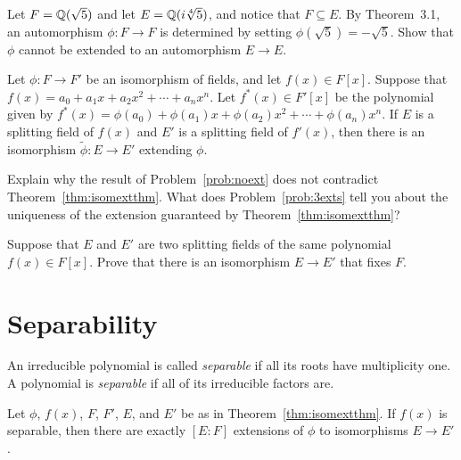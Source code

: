 \begin{problem}\label{prob:noext}
    Let $F = \mathbb{Q}(\sqrt{5})$ and let $E = \mathbb{Q}(i\sqrt[4]{5})$, and notice that $F\subseteq E$. By Theorem~3.1, an automorphism $\phi:F\longrightarrow F$ is determined by setting $\phi(\sqrt{5})=-\sqrt{5}$. Show that $\phi$ cannot be extended to an automorphism $E\longrightarrow E$.
\end{problem}



\begin{theorem}
    Let $\phi:F\longrightarrow F'$ be an isomorphism of fields, and let $f(x)\in F[x]$. Suppose that $f(x)=a_0 + a_1x + a_2x^2 + \cdots + a_nx^n$. Let $f^*(x)\in F'[x]$ be the polynomial given by $f^*(x)=\phi(a_0) + \phi(a_1)x + \phi(a_2)x^2 + \cdots + \phi(a_n)x^n$. If $E$ is a splitting field of $f(x)$ and $E'$ is a splitting field of $f'(x)$, then there is an isomorphism $\tilde{\phi}:E \longrightarrow E'$ extending $\phi$.
    \label{thm:isomextthm}
\end{theorem}

\begin{problem}
    Explain why the result of Problem~\ref{prob:noext} does not contradict Theorem~\ref{thm:isomextthm}. What does Problem~\ref{prob:3exts} tell you about the uniqueness of the extension guaranteed by Theorem~\ref{thm:isomextthm}?
\end{problem}



\begin{problem}
    Suppose that $E$ and $E'$ are two splitting fields of the same polynomial $f(x)\in F[x]$. Prove that there is an isomorphism $E \longrightarrow E'$ that fixes $F$.
\end{problem}




\section{Separability}

\begin{definition}
An irreducible polynomial is called \emph{separable} if all its roots have multiplicity one. A polynomial is \emph{separable} if all of its irreducible factors are.
\end{definition}
\begin{theorem}
    Let $\phi$, $f(x)$, $F$, $F'$, $E$, and $E'$ be as in Theorem~\ref{thm:isomextthm}. If $f(x)$ is separable, then there are exactly $[E:F]$ extensions of $\phi$ to isomorphisms $E \longrightarrow E'$.
    \label{thm:numexts}
\end{theorem}

